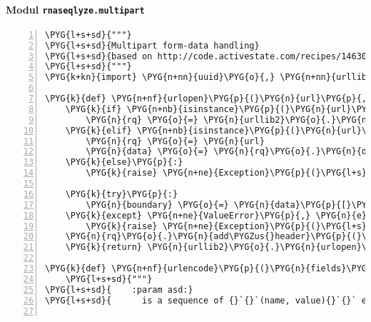 \paragraph{Modul \texttt{rnaseqlyze.multipart}}
\label{rnaseqlyze-pdf:modul-rnaseqlyze-multipart}
\begin{Verbatim}[commandchars=\\\{\},numbers=left,firstnumber=1,stepnumber=5]
\PYG{l+s+sd}{"""}
\PYG{l+s+sd}{Multipart form-data handling}
\PYG{l+s+sd}{based on http://code.activestate.com/recipes/146306/}
\PYG{l+s+sd}{"""}
\PYG{k+kn}{import} \PYG{n+nn}{uuid}\PYG{o}{,} \PYG{n+nn}{urllib2}\PYG{o}{,} \PYG{n+nn}{mimetypes}

\PYG{k}{def} \PYG{n+nf}{urlopen}\PYG{p}{(}\PYG{n}{url}\PYG{p}{,} \PYG{n}{data}\PYG{o}{=}\PYG{n+nb+bp}{None}\PYG{p}{)}\PYG{p}{:}
    \PYG{k}{if} \PYG{n+nb}{isinstance}\PYG{p}{(}\PYG{n}{url}\PYG{p}{,} \PYG{n+nb}{basestring}\PYG{p}{)}\PYG{p}{:}
        \PYG{n}{rq} \PYG{o}{=} \PYG{n}{urllib2}\PYG{o}{.}\PYG{n}{Request}\PYG{p}{(}\PYG{n}{url}\PYG{p}{,} \PYG{n}{data}\PYG{p}{)}
    \PYG{k}{elif} \PYG{n+nb}{isinstance}\PYG{p}{(}\PYG{n}{url}\PYG{p}{,} \PYG{n}{urllib2}\PYG{o}{.}\PYG{n}{Request}\PYG{p}{)}\PYG{p}{:}
        \PYG{n}{rq} \PYG{o}{=} \PYG{n}{url}
        \PYG{n}{data} \PYG{o}{=} \PYG{n}{rq}\PYG{o}{.}\PYG{n}{data}
    \PYG{k}{else}\PYG{p}{:}
        \PYG{k}{raise} \PYG{n+ne}{Exception}\PYG{p}{(}\PYG{l+s}{"}\PYG{l+s}{'}\PYG{l+s}{url}\PYG{l+s}{'}\PYG{l+s}{ parameter must be a string or urllib2.Request}\PYG{l+s}{"}\PYG{p}{)}

    \PYG{k}{try}\PYG{p}{:}
        \PYG{n}{boundary} \PYG{o}{=} \PYG{n}{data}\PYG{p}{[}\PYG{l+m+mi}{2}\PYG{p}{:}\PYG{n}{data}\PYG{o}{.}\PYG{n}{index}\PYG{p}{(}\PYG{l+s}{"}\PYG{l+s+se}{\PYGZbs{}r}\PYG{l+s}{"}\PYG{p}{)}\PYG{p}{]}
    \PYG{k}{except} \PYG{n+ne}{ValueError}\PYG{p}{,} \PYG{n}{e}\PYG{p}{:}
        \PYG{k}{raise} \PYG{n+ne}{Exception}\PYG{p}{(}\PYG{l+s}{"}\PYG{l+s}{couldn}\PYG{l+s}{'}\PYG{l+s}{t find boundary string in data}\PYG{l+s}{"}\PYG{p}{,} \PYG{n}{e}\PYG{p}{)}
    \PYG{n}{rq}\PYG{o}{.}\PYG{n}{add\PYGZus{}header}\PYG{p}{(}\PYG{l+s}{'}\PYG{l+s}{Content-Type}\PYG{l+s}{'}\PYG{p}{,} \PYG{l+s}{'}\PYG{l+s}{multipart/form-data; boundary=}\PYG{l+s+si}{\PYGZpc{}s}\PYG{l+s}{'} \PYG{o}{\PYGZpc{}} \PYG{n}{boundary}\PYG{p}{)}
    \PYG{k}{return} \PYG{n}{urllib2}\PYG{o}{.}\PYG{n}{urlopen}\PYG{p}{(}\PYG{n}{rq}\PYG{p}{)}

\PYG{k}{def} \PYG{n+nf}{urlencode}\PYG{p}{(}\PYG{n}{fields}\PYG{p}{,} \PYG{n}{files}\PYG{o}{=}\PYG{n+nb+bp}{None}\PYG{p}{)}\PYG{p}{:}
    \PYG{l+s+sd}{"""}
\PYG{l+s+sd}{    :param asd:}
\PYG{l+s+sd}{      is a sequence of {}`{}`(name, value){}`{}` elements for regular form fields.}


\end{Verbatim}
